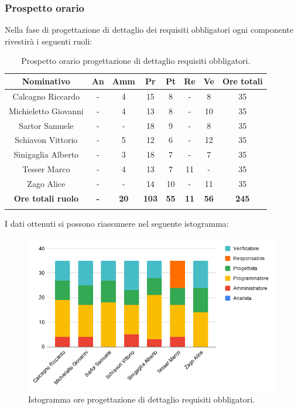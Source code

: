 \subsubsection{Prospetto orario}

Nella fase di progettazione di dettaglio dei requisiti obbligatori ogni componente rivestirà i seguenti ruoli:
\begin{longtable}{|c|c|c|c|c|c|c|c|}
	\hline
	\rowcolor[HTML]{F9CB9C} 
	\textbf{Nominativo} & \textbf{An} & \textbf{Amm} & \textbf{Pr} & \textbf{Pt} & \textbf{Re} & \textbf{Ve} & \textbf{Ore totali} \\
	\hline
	Calcagno Riccardo & 
	- & 
	4 & 
	15 & 
	8 & 
	- & 
	8 & 
	35 \\
	\hline
	Michieletto Giovanni & 
	- & 
	4 & 
	13 & 
	8 & 
	- & 
	10 & 
	35 \\
	\hline
	Sartor Samuele &  
	- & 
	- & 
	18 & 
	9 & 
	- & 
	8 & 
	35 \\
	\hline
	Schiavon Vittorio &  
	- & 
	5 & 
	12 & 
	6 & 
	- & 
	12 & 
	35 \\
	\hline
	Sinigaglia Alberto &  
	- & 
	3 & 
	18 & 
	7 & 
	- & 
	7 & 
	35 \\
	\hline
	Tesser Marco  & 
	- & 
	4 & 
	13 & 
	7 & 
	11 & 
	- & 
	35 \\
	\hline
	Zago Alice & 
	- & 
	- & 
	14 & 
	10 & 
	- & 
	11 & 
	35 \\
	\hline	
	\rowcolor[HTML]{F9CB9C} 
	\textbf{Ore totali ruolo} & \textbf{-} & \textbf{20} & \textbf{103} & \textbf{55} & \textbf{11} & \textbf{56} & \textbf{245} \\
	\hline
	\caption{Prospetto orario progettazione di dettaglio requisiti obbligatori.}
	\label{fig: Prospetto orario progettazione di dettaglio requisiti obbligatori.}
\end{longtable}

I dati ottenuti si possono riassumere nel seguente istogramma:
\begin{figure}[H]
	\centering
	\includegraphics[width=0.8\linewidth]{./res/images/OreObbligatori.png}
	\caption{Istogramma ore progettazione di dettaglio requisiti obbligatori.}
	\label{fig: Istogramma ore progettazione di dettaglio requisiti obbligatori.}
\end{figure}


